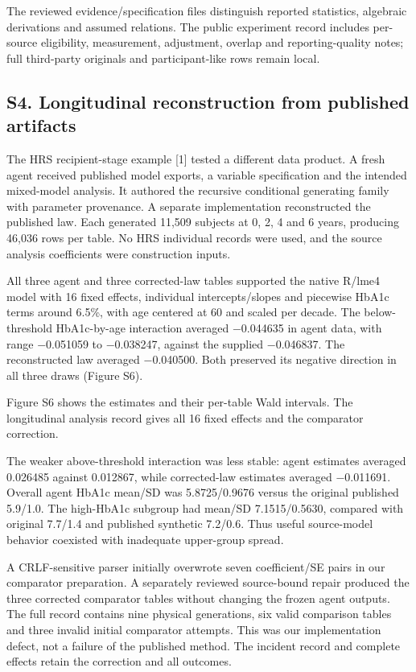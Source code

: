 \documentclass[sigconf,review]{acmart}
\begin{document}
The reviewed evidence/\allowbreak{}specification files distinguish reported statistics, algebraic derivations and assumed relations. The public experiment record includes per-source eligibility, measurement, adjustment, overlap and reporting-quality notes; full third-party originals and participant-like rows remain local.


\subsection*{S4. Longitudinal reconstruction from published artifacts}

The HRS recipient-stage example [1] tested a different data product. A fresh agent received published model exports, a variable specification and the intended mixed-model analysis. It authored the recursive conditional generating family with parameter provenance. A separate implementation reconstructed the published law. Each generated 11,509 subjects at 0, 2, 4 and 6 years, producing 46,036 rows per table. No HRS individual records were used, and the source analysis coefficients were construction inputs.


All three agent and three corrected-law tables supported the native R/\allowbreak{}lme4 model with 16 fixed effects, individual intercepts/\allowbreak{}slopes and piecewise HbA1c terms around 6.5\%, with age centered at 60 and scaled per decade. The below-threshold HbA1c-by-age interaction averaged −0.044635 in agent data, with range −0.051059 to −0.038247, against the supplied −0.046837. The reconstructed law averaged −0.040500. Both preserved its negative direction in all three draws (Figure S6).


Figure S6 shows the estimates and their per-table Wald intervals. The longitudinal analysis record gives all 16 fixed effects and the comparator correction.


The weaker above-threshold interaction was less stable: agent estimates averaged 0.026485 against 0.012867, while corrected-law estimates averaged −0.011691. Overall agent HbA1c mean/\allowbreak{}SD was 5.8725/\allowbreak{}0.9676 versus the original published 5.9/\allowbreak{}1.0. The high-HbA1c subgroup had mean/\allowbreak{}SD 7.1515/\allowbreak{}0.5630, compared with original 7.7/\allowbreak{}1.4 and published synthetic 7.2/\allowbreak{}0.6. Thus useful source-model behavior coexisted with inadequate upper-group spread.


A CRLF-sensitive parser initially overwrote seven coefficient/\allowbreak{}SE pairs in our comparator preparation. A separately reviewed source-bound repair produced the three corrected comparator tables without changing the frozen agent outputs. The full record contains nine physical generations, six valid comparison tables and three invalid initial comparator attempts. This was our implementation defect, not a failure of the published method. The incident record and complete effects retain the correction and all outcomes.
\end{document}
